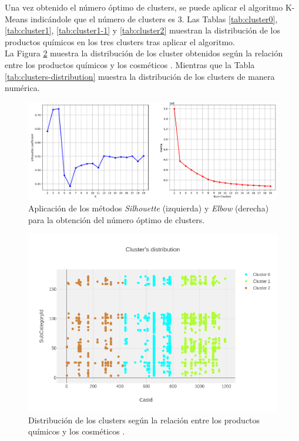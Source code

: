 Una vez obtenido el número óptimo de clusters, se puede aplicar el algoritmo K-Means indicándole que el número de clusters es 3. Las Tablas \ref{tab:cluster0}, \ref{tab:cluster1}, \ref{tab:cluster1-1} y \ref{tab:cluster2} muestran la distribución de los productos químicos en los tres clusters tras aplicar el algoritmo. \\

La Figura \ref{fig:clusters-distribution} muestra la distribución de los cluster obtenidos según la relación entre los productos químicos  y los cosméticos . Mientras que la Tabla \ref{tab:clusters-distribution} muestra la distribución de los clusters de manera numérica.


\begin{figure}[!th]
\includegraphics[scale=0.45]{figures/silhouette-elbow-methods}
\centering
\caption{Aplicación de los métodos \textit{Silhouette} (izquierda) y \textit{Elbow} (derecha) para la obtención del número óptimo de clusters.}
\label{fig:silhouette-elbow-methods}
\end{figure}

\begin{figure}[!th]
\includegraphics[scale=0.5]{figures/clusters-distribution}
\centering
\caption{Distribución de los clusters según la relación entre los productos químicos  y los cosméticos .}
\label{fig:clusters-distribution}
\end{figure}

